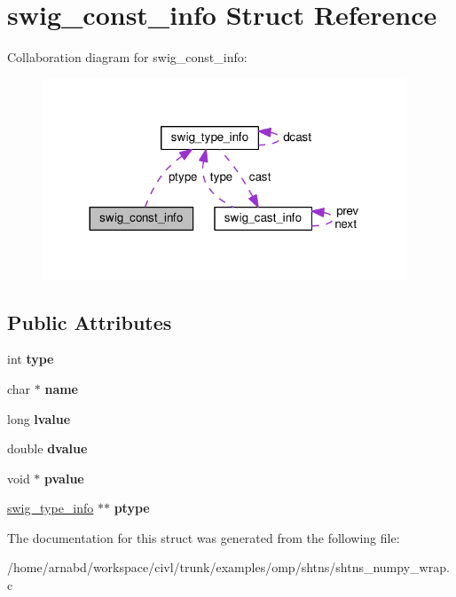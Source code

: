 \hypertarget{structswig__const__info}{}\section{swig\+\_\+const\+\_\+info Struct Reference}
\label{structswig__const__info}


Collaboration diagram for swig\+\_\+const\+\_\+info\+:
\nopagebreak
\begin{figure}[H]
\begin{center}
\leavevmode
\includegraphics[width=308pt]{structswig__const__info__coll__graph}
\end{center}
\end{figure}
\subsection*{Public Attributes}
\begin{DoxyCompactItemize}
\item 
\hypertarget{structswig__const__info_ae8bbc99e1cda11f24e306365cbf33893}{}int {\bfseries type}\label{structswig__const__info_ae8bbc99e1cda11f24e306365cbf33893}

\item 
\hypertarget{structswig__const__info_aad383d74116313cf9a8532e163368050}{}char $\ast$ {\bfseries name}\label{structswig__const__info_aad383d74116313cf9a8532e163368050}

\item 
\hypertarget{structswig__const__info_af142e4c21ad4fe61f6c2624bff034583}{}long {\bfseries lvalue}\label{structswig__const__info_af142e4c21ad4fe61f6c2624bff034583}

\item 
\hypertarget{structswig__const__info_a74e477f1dbf515bcb7e2ef07a1d34c35}{}double {\bfseries dvalue}\label{structswig__const__info_a74e477f1dbf515bcb7e2ef07a1d34c35}

\item 
\hypertarget{structswig__const__info_abbc43512c364bff11fac5961c1155090}{}void $\ast$ {\bfseries pvalue}\label{structswig__const__info_abbc43512c364bff11fac5961c1155090}

\item 
\hypertarget{structswig__const__info_aedd46d173c5b5ed4ee60ad5660233557}{}\hyperlink{structswig__type__info}{swig\+\_\+type\+\_\+info} $\ast$$\ast$ {\bfseries ptype}\label{structswig__const__info_aedd46d173c5b5ed4ee60ad5660233557}

\end{DoxyCompactItemize}


The documentation for this struct was generated from the following file\+:\begin{DoxyCompactItemize}
\item 
/home/arnabd/workspace/civl/trunk/examples/omp/shtns/shtns\+\_\+numpy\+\_\+wrap.\+c\end{DoxyCompactItemize}
